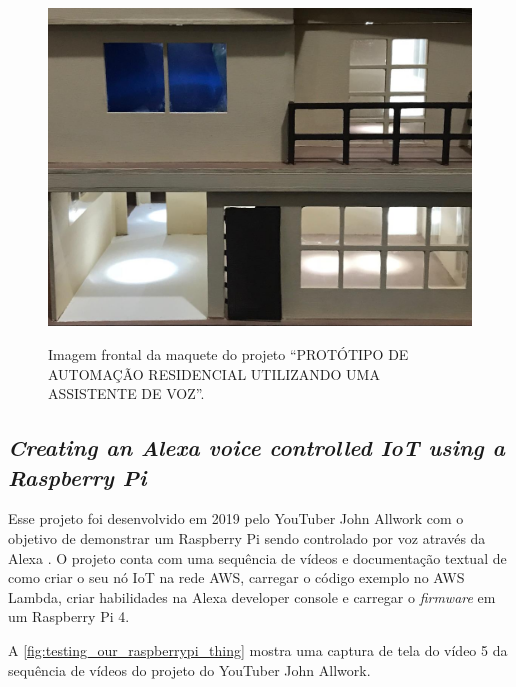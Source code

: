 \begin{figure}[htbp]
    \centering
    \caption{Imagem frontal da maquete do projeto ``PROTÓTIPO DE AUTOMAÇÃO RESIDENCIAL UTILIZANDO UMA ASSISTENTE DE VOZ''.}
    \includegraphics[scale=0.4]{Imagens/maquete_leandro_dallarosa.png}
    \label{fig:maquete_leandro_dallarosa}
\end{figure}

\subsection{\textit{Creating an Alexa voice controlled IoT using a Raspberry Pi}}\label{subsection:creating_an_alexa_voice_controlled_iot_using_a_raspberry_pi}

Esse projeto foi desenvolvido em 2019 pelo YouTuber John Allwork com o objetivo de demonstrar um Raspberry Pi sendo controlado por voz através da Alexa \cite{ref:032}. O projeto conta com uma sequência de vídeos e documentação textual de como criar o seu nó IoT na rede AWS, carregar o código exemplo no AWS Lambda, criar habilidades na Alexa developer console e carregar o \textit{firmware} em um Raspberry Pi 4.

A \autoref{fig:testing_our_raspberrypi_thing} mostra uma captura de tela do vídeo 5 da sequência de vídeos do projeto do YouTuber John Allwork.

